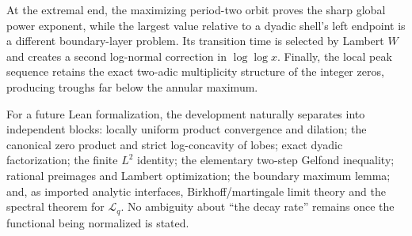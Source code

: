 \documentclass[11pt,oneside]{article}
\theoremstyle{definition}
\theoremstyle{remark}
\newcommand{\Lop}{\mathcal L}
\begin{document}
At the extremal end, the maximizing period-two orbit proves the sharp global
power exponent, while the largest value relative to a dyadic shell's left
endpoint is a different boundary-layer problem.  Its transition time is
selected by Lambert $W$ and creates a second log-normal correction in
$\log\log x$.  Finally, the local peak sequence retains the exact two-adic
multiplicity structure of the integer zeros, producing troughs far below the
annular maximum.

For a future Lean formalization, the development naturally separates into
independent blocks: locally uniform product convergence and dilation; the
canonical zero product and strict log-concavity of lobes; exact dyadic
factorization; the finite $L^2$ identity; the elementary two-step Gelfond
inequality; rational preimages and Lambert optimization; the boundary maximum
lemma; and, as imported analytic interfaces, Birkhoff/martingale limit theory
and the spectral theorem for $\Lop_q$.  No ambiguity about ``the decay rate''
remains once the functional being normalized is stated.
\end{document}

